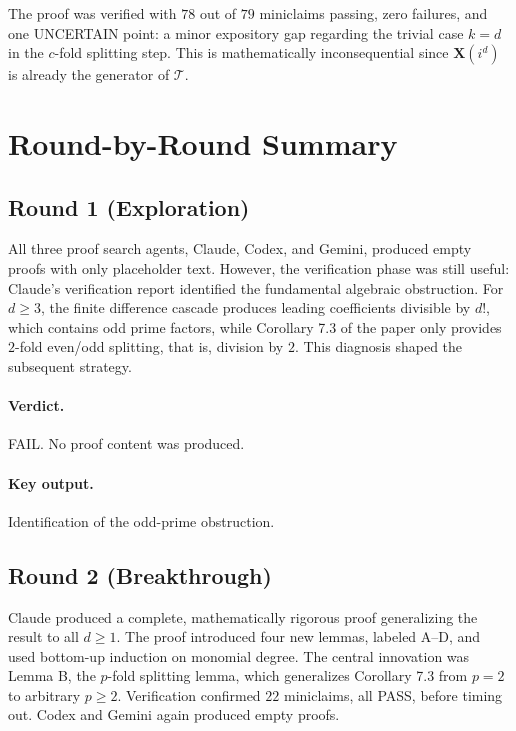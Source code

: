 \documentclass[11pt]{article}
\newcommand{\XX}{\mathbf{X}}
\newcommand{\TT}{\mathcal{T}}
\begin{document}
The proof was verified with $78$ out of $79$ miniclaims passing, zero failures, and one UNCERTAIN point: a minor expository gap regarding the trivial case $k=d$ in the $c$-fold splitting step. This is mathematically inconsequential since $\XX(i^d)$ is already the generator of $\TT$.

\section{Round-by-Round Summary}

\subsection{Round 1 (Exploration)}

All three proof search agents, Claude, Codex, and Gemini, produced empty proofs with only placeholder text. However, the verification phase was still useful: Claude's verification report identified the fundamental algebraic obstruction. For $d \geqslant 3$, the finite difference cascade produces leading coefficients divisible by $d!$, which contains odd prime factors, while Corollary 7.3 of the paper only provides $2$-fold even/odd splitting, that is, division by $2$. This diagnosis shaped the subsequent strategy.

\paragraph{Verdict.}
FAIL. No proof content was produced.

\paragraph{Key output.}
Identification of the odd-prime obstruction.

\subsection{Round 2 (Breakthrough)}

Claude produced a complete, mathematically rigorous proof generalizing the result to all $d \geqslant 1$. The proof introduced four new lemmas, labeled A--D, and used bottom-up induction on monomial degree. The central innovation was Lemma B, the $p$-fold splitting lemma, which generalizes Corollary 7.3 from $p=2$ to arbitrary $p \geqslant 2$. Verification confirmed $22$ miniclaims, all PASS, before timing out. Codex and Gemini again produced empty proofs.
\end{document}
